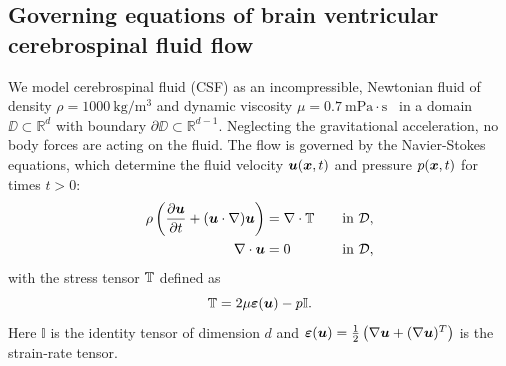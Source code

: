 \documentclass{template}
\begin{document}
\subsection{Governing equations of brain ventricular cerebrospinal fluid flow}
We model cerebrospinal fluid (CSF) as an incompressible, Newtonian fluid of density
$\rho=1000 \ \mathrm{kg/m^3}$ and dynamic viscosity
$\mu=0.7 \ \mathrm{mPa\cdot s}$~\cite{Bloomfield1998EffectsFluid}
in a domain $\DD\subset\mathbb{R}^d$
with boundary $\partial\DD\subset\mathbb{R}^{d-1}$.
Neglecting the gravitational acceleration, no body forces are acting on the fluid.
The flow is governed by the Navier-Stokes equations, which determine the
fluid velocity $\bm{u}(\bm{x}, t)$ and pressure $p(\bm{x}, t)$ for times $t > 0$:
\begin{alignat}{2}
    \rho\left(\frac{\partial \bm{u}}{\partial t}
    + (\bm{u}\cdot\nabla)\bm{u}\right) &= \nabla\cdot\mathbb{T} \quad&&\text{in }\mathcal{D},
    \label{eq:navier_stokes_mom_eq} \\
    \nabla\cdot\bm{u} &= 0 \quad&&\text{in }\mathcal{D},
    \label{eq:continuity_eq}
\end{alignat}
with the stress tensor $\mathbb{T}$ defined as
\begin{equation*}
    \mathbb{T} = 2\mu\bm{\varepsilon}(\bm{u}) - p\mathbb{I}.
\end{equation*}
Here $\mathbb{I}$ is the identity tensor of dimension $d$ and
$\bm{\varepsilon}(\bm{u})=\frac{1}{2}\left(\nabla\bm{u} + (\nabla\bm{u})^T\right)$ is the
strain-rate tensor.
\end{document}
